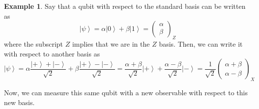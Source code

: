 \documentclass{article}
\newcommand{\ket}[1]{\ensuremath{\left|#1\right\rangle}}
\theoremstyle{definition}
\newtheorem{example}{Example}[section]
\begin{document}
    \begin{example} 
      Say that a qubit with respect to the standard basis can be written as 
      \begin{equation}
        \ket{\psi} = \alpha \ket{0} + \beta \ket{1} = \begin{pmatrix} \alpha \\ \beta \end{pmatrix}_Z 
      \end{equation}
      where the subscript $Z$ implies that we are in the $Z$ basis. Then, we can write it with respect to another basis as 
      \begin{equation}
        \ket{\psi} = \alpha \frac{\ket{+} + \ket{-}}{\sqrt{2}} + \beta \frac{\ket{+} - \ket{-}}{\sqrt{2}} = \frac{\alpha + \beta}{\sqrt{2}} \ket{+} + \frac{\alpha - \beta}{\sqrt{2}} \ket{-} = \frac{1}{\sqrt{2}} \begin{pmatrix} \alpha + \beta \\ \alpha - \beta \end{pmatrix}_X
      \end{equation}
    \end{example}

    Now, we can measure this same qubit with a new observable with respect to this new basis. 
\end{document}
